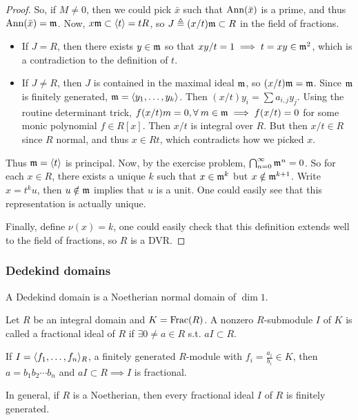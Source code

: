 \begin{prop}
\begin{proof}
    So, if $M \neq 0$, then we could pick $\bar{x}$ such that $\operatorname{Ann}(\bar{x})$
    is a prime, and thus $\operatorname{Ann}(\bar{x}) = \mathfrak{m}$.
    Now, $x \mathfrak{m} \subset \langle t\rangle = tR$, so $J \triangleq (x/t) \mathfrak{m} \subset R$ in the field of fractions.
    \begin{itemize}
      \item If $J = R$, then there exists $y \in \mathfrak{m}$ so that $xy / t = 1 \implies t = xy \in \mathfrak{m}^2$,
        which is a contradiction to the definition of $t$.
      \item If $J \neq R$, then $J$ is contained in the maximal ideal $\mathfrak{m}$,
        so $(x/t) \mathfrak{m} = \mathfrak{m}$. Since $\mathfrak{m}$ is finitely generated, $\mathfrak{m} = \langle y_1, \dots, y_k\rangle$.
        Then $(x/t) y_i = \sum a_{i, j} y_j$. Using the routine determinant trick,
        $f(x/t) m = 0, \forall m \in \mf \implies f(x/t) = 0$ for some monic polynomial $f \in R[x]$.
        Then $x/t$ is integral over $R$. But then $x/t \in R$ since $R$ normal,
        and thus $x \in Rt$, which contradicts how we picked $x$.
    \end{itemize}

    Thus $\mathfrak{m} = \langle t\rangle$ is principal. Now, by the exercise problem,
    $\bigcap_{n = 0}^\infty \mathfrak{m}^n = 0$. So for each $x \in R$,
    there exists a unique $k$ such that $x \in \mathfrak{m}^k$ but $x \notin \mathfrak{m}^{k+1}$.
    Write $x = t^k u$, then $u \notin \mathfrak{m}$ implies that $u$ is a unit.
    One could easily see that this representation is actually unique.

    Finally, define $\nu(x) = k$, one could easily check that this definition
    extends well to the field of fractions, so $R$ is a DVR.
  \end{proof}
\end{prop}

\subsubsection{Dedekind domains}
\begin{definition}
  A Dedekind domain is a Noetherian normal domain of $\dim 1$.
\end{definition}

\begin{definition}
  Let $R$ be an integral domain and $K = \operatorname{Frac}(R)$.
  A nonzero $R$-submodule $I$ of $K$ is called a fractional ideal of $R$ if
  $\exists 0 \ne a \in R$ s.t. $aI \subset R$.
\end{definition}

\begin{example} \label{eg:finitely-generated-is-fractional-ideal}
  If $I = \langle f_1, \dots, f_n\rangle_R$, a finitely generated $R$-module
  with $f_i = \frac{a_i}{b_i} \in K$, then
  $a = b_1b_2 \dotsm b_n$ and $aI \subset R \implies I$ is fractional.

  In general, if $R$ is a Noetherian, then every fractional ideal $I$ of $R$
  is finitely generated.
\end{example}

